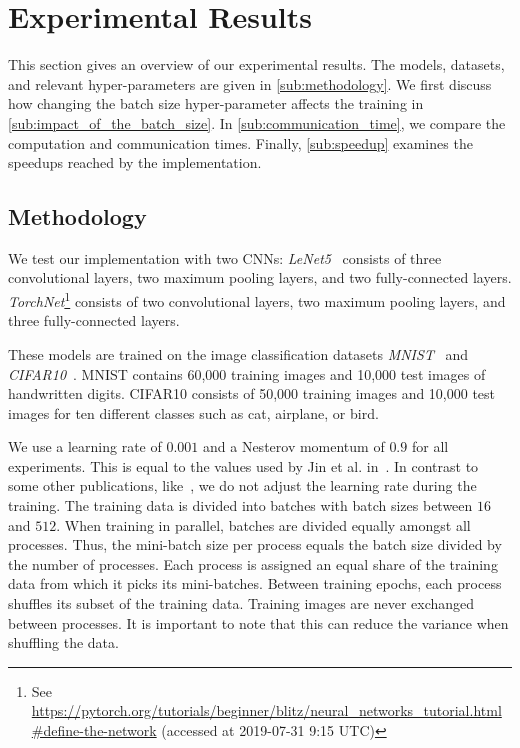 \documentclass[conference]{IEEEtran}
\begin{document}

\section{Experimental Results} %
\label{sec:experimental_results}

This section gives an overview of our experimental results.
The models, datasets, and relevant hyper-parameters are given in \autoref{sub:methodology}.
We first discuss how changing the batch size hyper-parameter affects the training in \autoref{sub:impact_of_the_batch_size}.
In \autoref{sub:communication_time}, we compare the computation and communication times.
Finally, \autoref{sub:speedup} examines the speedups reached by the implementation.

\subsection{Methodology} %
\label{sub:methodology}

We test our implementation with two CNNs:
\emph{LeNet5}~\cite{lecun1998gradient} consists of three convolutional layers, two maximum pooling layers, and two fully-connected layers.
\emph{TorchNet}\footnote{See \url{https://pytorch.org/tutorials/beginner/blitz/neural_networks_tutorial.html\#define-the-network} (accessed at 2019-07-31 9:15 UTC)} consists of two convolutional layers, two maximum pooling layers, and three fully-connected layers.

These models are trained on the image classification datasets \emph{MNIST}~\cite{lecun1998gradient} and \emph{CIFAR10}~\cite{krizhevsky2009CIFAR10}.
MNIST contains 60,000 training images and 10,000 test images of handwritten digits.
CIFAR10 consists of 50,000 training images and 10,000 test images for ten different classes such as cat, airplane, or bird.

We use a learning rate of $0.001$ and a Nesterov momentum of $0.9$ for all experiments.
This is equal to the values used by Jin et al. in~\cite{jin2016-How-to-scale}.
In contrast to some other publications, like~\cite{jin2016-How-to-scale}, we do not adjust the learning rate during the training.
%
The training data is divided into batches with batch sizes between $16$ and $512$.
When training in parallel, batches are divided equally amongst all processes.
Thus, the mini-batch size per process equals the batch size divided by the number of processes.
%
Each process is assigned an equal share of the training data from which it picks its mini-batches.
Between training epochs, each process shuffles its subset of the training data.
Training images are never exchanged between processes.
It is important to note that this can reduce the variance when shuffling the data.
\end{document}

